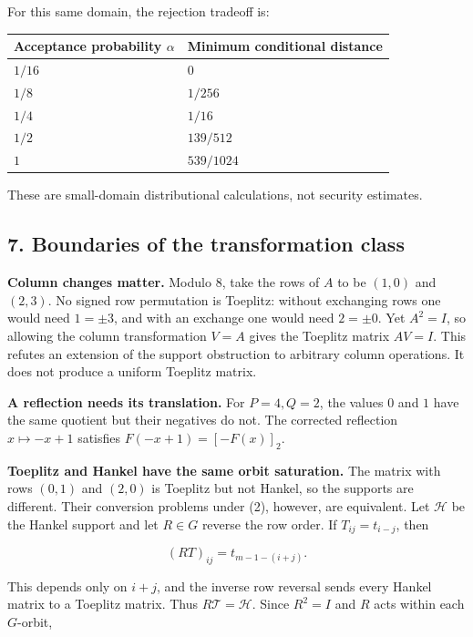 \documentclass[
]{article}
\begin{document}
For this same domain, the rejection tradeoff is:

\begin{longtable}[]{@{}ll@{}}
\toprule\noalign{}
Acceptance probability \(\alpha\) & Minimum conditional distance \\
\midrule\noalign{}
\endhead
\bottomrule\noalign{}
\endlastfoot
\(1/16\) & \(0\) \\
\(1/8\) & \(1/256\) \\
\(1/4\) & \(1/16\) \\
\(1/2\) & \(139/512\) \\
\(1\) & \(539/1024\) \\
\end{longtable}

These are small-domain distributional calculations, not security
estimates.

\subsection{7. Boundaries of the transformation
class}\label{boundaries-of-the-transformation-class}

\textbf{Column changes matter.} Modulo \(8\), take the rows of \(A\) to
be \((1,0)\) and \((2,3)\). No signed row permutation is Toeplitz:
without exchanging rows one would need \(1=\pm3\), and with an exchange
one would need \(2=\pm0\). Yet \(A^2=I\), so allowing the column
transformation \(V=A\) gives the Toeplitz matrix \(AV=I\). This refutes
an extension of the support obstruction to arbitrary column operations.
It does not produce a uniform Toeplitz matrix.

\textbf{A reflection needs its translation.} For \(P=4,Q=2\), the values
\(0\) and \(1\) have the same quotient but their negatives do not. The
corrected reflection \(x\mapsto-x+1\) satisfies \(F(-x+1)=[-F(x)]_2\).

\textbf{Toeplitz and Hankel have the same orbit saturation.} The matrix
with rows \((0,1)\) and \((2,0)\) is Toeplitz but not Hankel, so the
supports are different. Their conversion problems under (2), however,
are equivalent. Let \(\mathcal H\) be the Hankel support and let
\(R\in G\) reverse the row order. If \(T_{ij}=t_{i-j}\), then

\[
(RT)_{ij}=t_{m-1-(i+j)}.
\]

This depends only on \(i+j\), and the inverse row reversal sends every
Hankel matrix to a Toeplitz matrix. Thus \(R\mathcal T=\mathcal H\).
Since \(R^2=I\) and \(R\) acts within each \(G\)-orbit,
\end{document}
